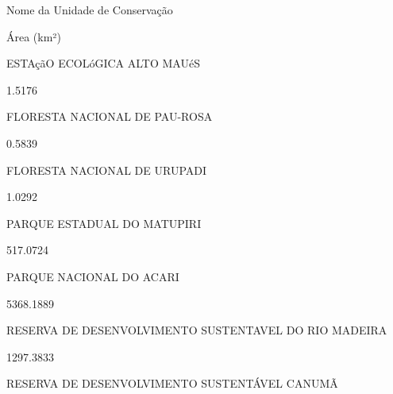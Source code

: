 \documentclass[
  letterpaper,
]{report}
\begin{document}
\n  

\n    

\n      

Nome da Unidade de Conservação

\n      

Área (km²)

\n    

\n  

\n  

\n    

\n      

ESTAçãO ECOLóGICA ALTO MAUéS

\n      

1.5176

\n    

\n    

\n      

FLORESTA NACIONAL DE PAU-ROSA

\n      

0.5839

\n    

\n    

\n      

FLORESTA NACIONAL DE URUPADI

\n      

1.0292

\n    

\n    

\n      

PARQUE ESTADUAL DO MATUPIRI

\n      

517.0724

\n    

\n    

\n      

PARQUE NACIONAL DO ACARI

\n      

5368.1889

\n    

\n    

\n      

RESERVA DE DESENVOLVIMENTO SUSTENTAVEL DO RIO MADEIRA

\n      

1297.3833

\n    

\n    

\n      

RESERVA DE DESENVOLVIMENTO SUSTENTÁVEL CANUMÃ

\n      
\end{document}
